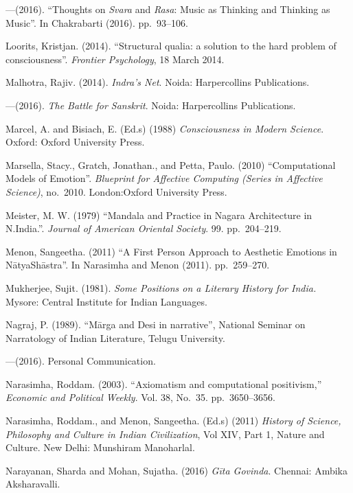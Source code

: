 \begin{thebibliography}{99}
---\kern3pt(2016). “Thoughts on \textsl{Svara} and \textsl{Rasa}: Music as Thinking and Thinking as Music”. In Chakrabarti (2016). pp.~93--106.

Loorits, Kristjan. (2014). “Structural qualia: a solution to the hard problem of consciousness”. \textsl{Frontier Psychology}, 18 March 2014.

Malhotra, Rajiv. (2014). \textsl{Indra’s Net}. Noida: Harpercollins Publications.

---\kern3pt(2016). \textsl{The Battle for Sanskrit}. Noida: Harpercollins Publications.

Marcel, A. and Bisiach, E. (Ed.s) (1988) \textsl{Consciousness in Modern Science}. Oxford: Oxford University Press.

Marsella, Stacy., Gratch, Jonathan., and Petta, Paulo. (2010) “Computational Models of Emotion”. \textsl{Blueprint for Affective Computing (Series in Affective Science)}, no.~2010. London:Oxford University Press.

Meister, M. W. (1979) “Mandala and Practice in Nagara Architecture in N.India.”. \textsl{Journal of American Oriental Society}. 99. pp.~204--219.

Menon, Sangeetha. (2011) “A First Person Approach to Aesthetic Emotions in NātyaShāstra”. In Narasimha and Menon (2011). pp.~259--270.

Mukherjee, Sujit. (1981). \textsl{Some Positions on a Literary History for India.} Mysore: Central Institute for Indian Languages.

Nagraj, P. (1989). “Mārga and Desi in narrative”, National Seminar on Narratology of Indian Literature, Telugu University.

---\kern3pt(2016). Personal Communication.

Narasimha, Roddam. (2003). “Axiomatism and computational positivism,” \textsl{Economic and Political Weekly}. Vol. 38, No.~35. pp.~3650--3656.

Narasimha, Roddam., and Menon, Sangeetha. (Ed.s) (2011) \textsl{History of Science, Philosophy and Culture in Indian Civilization}, Vol XIV, Part 1, Nature and Culture. New Delhi: Munshiram Manoharlal.

Narayanan, Sharda and Mohan, Sujatha. (2016) \textsl{Gīta Govinda}. Chennai: Ambika Aksharavalli.


\end{thebibliography}
